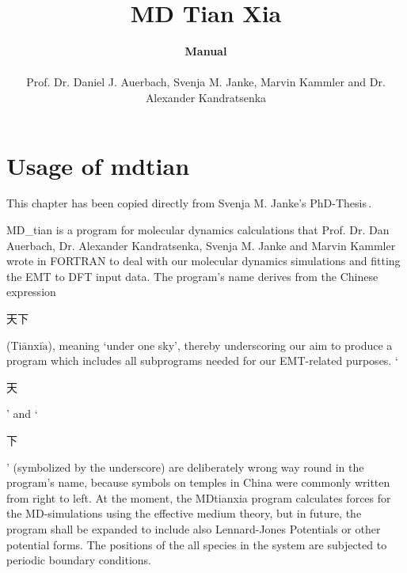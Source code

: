 \documentclass[twoside, 11pt, titlepage, captions=nooneline, a4paper, headsepline]{scrbook}%
\title{\huge{MD Tian Xia}}
\author{\textbf{Manual}\\ \\Prof. Dr. Daniel J. Auerbach, Svenja M. Janke, Marvin Kammler and Dr. Alexander Kandratsenka}
\date{}
\begin{document}
\frontmatter

\maketitle
\thispagestyle{empty}
\newpage
\tableofcontents
\newpage


\mainmatter

\chapter{Usage of mdtian}
\label{Sec:usage:MDtian}
This chapter has been copied directly from Svenja M. Janke's PhD-Thesis\,\cite{svenjaphd}.

MD\_tian is a program for molecular dynamics calculations that Prof. Dr. Dan Auerbach, Dr. Alexander Kandratsenka, Svenja M. Janke and Marvin Kammler wrote in FORTRAN to deal with our molecular dynamics simulations and fitting the EMT to DFT input data. The program's name derives from the Chinese expression
\begin{CJK*}{UTF8}{gbsn}
天下
\end{CJK*}
(Ti$\bar{\mathrm{a}}$nxi$\grave{\mathrm{a}}$), meaning `under one sky', thereby underscoring our aim to produce a program which includes all subprograms needed for our EMT-related purposes. `\begin{CJK*}{UTF8}{gbsn}
天
\end{CJK*}' and `\begin{CJK*}{UTF8}{gbsn}
下
\end{CJK*}' (symbolized by the underscore) are deliberately wrong way round in the program's name, because symbols on temples in China were commonly written from right to left.
At the moment, the MDtianxia program calculates forces for the MD-simulations using the effective medium theory, but in future, the program shall be expanded to include also Lennard-Jones Potentials or other potential forms. 
The positions of the all species in the system are subjected to periodic boundary conditions.
\end{document}

